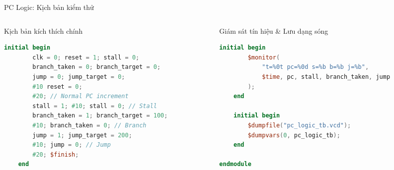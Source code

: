 \begin{frame}[fragile]{PC Logic: Kịch bản kiểm thử}
    \begin{columns}[t]
        \begin{column}{0.48\textwidth}
            \begin{block}{Kịch bản kích thích chính}
                \begin{lstlisting}[language=Verilog, basicstyle=\fontsize{6.5pt}{8.0pt}\selectfont\ttfamily, keywordstyle=\color{blue}, commentstyle=\color{gray}]
    initial begin
        clk = 0; reset = 1; stall = 0;
        branch_taken = 0; branch_target = 0;
        jump = 0; jump_target = 0;
        #10 reset = 0;
        #20; // Normal PC increment
        stall = 1; #10; stall = 0; // Stall
        branch_taken = 1; branch_target = 100;
        #10; branch_taken = 0; // Branch
        jump = 1; jump_target = 200;
        #10; jump = 0; // Jump
        #20; $finish;
    end
                \end{lstlisting}
            \end{block}
        \end{column}
        
        \begin{column}{0.48\textwidth}
            \begin{block}{Giám sát tín hiệu \& Lưu dạng sóng}
                \begin{lstlisting}[language=Verilog, basicstyle=\fontsize{6.5pt}{8.0pt}\selectfont\ttfamily, keywordstyle=\color{blue}, commentstyle=\color{gray}]
    initial begin
        $monitor(
            "t=%0t pc=%0d s=%b b=%b j=%b",
            $time, pc, stall, branch_taken, jump
        );
    end

    initial begin
        $dumpfile("pc_logic_tb.vcd");
        $dumpvars(0, pc_logic_tb);
    end

endmodule
                \end{lstlisting}
            \end{block}
        \end{column}
    \end{columns}
\end{frame}
